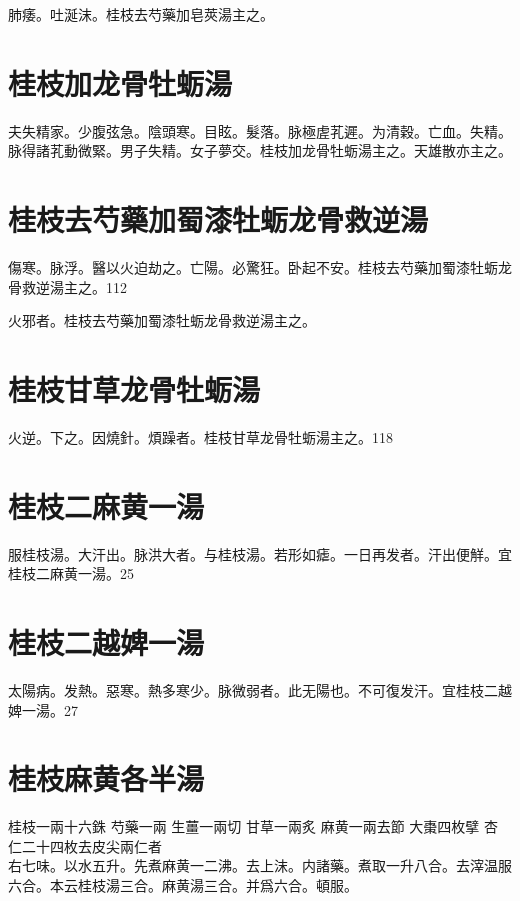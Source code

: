 \documentclass[12pt,twoside,UTF8,b5paper]{ctexbook}
\begin{document}
肺痿。吐涎沫。桂枝去芍藥加皂莢湯主之。

\section{桂枝加龙骨牡蛎湯}

夫失精家。少腹弦急。陰頭寒。目眩。髮落。脉極虗芤遲。为清穀。亡血。失精。脉得諸芤動微緊。男子失精。女子夢交。桂枝加龙骨牡蛎湯主之。天雄散亦主之。

\section{桂枝去芍藥加蜀漆牡蛎龙骨救逆湯}

傷寒。脉浮。醫以火迫劫之。亡陽。{必}驚狂。卧起不安。桂枝去芍藥加蜀漆牡蛎龙骨救逆湯主之。112

火邪者。桂枝去芍藥加蜀漆牡蛎龙骨救逆湯主之。

\section{桂枝甘草龙骨牡蛎湯}

火逆。下之。因燒針。煩躁者。桂枝甘草龙骨牡蛎湯主之。118

\section{桂枝二麻黄一湯}

服桂枝湯。大汗出。脉洪大者。与桂枝湯。若形如瘧。一日再发者。汗出便觧。宜桂枝二麻黄一湯。25

\section{桂枝二越婢一湯}

太陽病。发熱。惡寒。熱多寒少。脉微弱者。此无陽也。不可{復}发汗。{宜桂枝二越婢一湯。}27

\section{桂枝麻黄各半湯}

桂枝{\scriptsize 一兩十六銖} 芍藥{\scriptsize 一兩} 生薑{\scriptsize 一兩切} 甘草{\scriptsize 一兩炙} 麻黄{\scriptsize 一兩去節} 大棗{\scriptsize 四枚擘} 杏仁{\scriptsize 二十四枚去皮尖兩仁者}\\
右七味。以水五升。先煮麻黄一二沸。去上沫。内諸藥。煮取一升八合。去滓温服六合。本云桂枝湯三合。麻黄湯三合。并爲六合。頓服。
\end{document}
